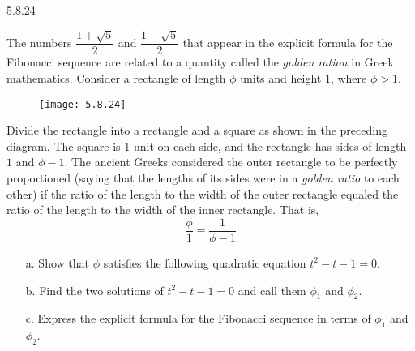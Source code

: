 \newpage
\begin{question}
    {5.8.24}
    {
        The numbers $\dfrac{1 + \sqrt{5}}{2}$ and $\dfrac{1 - \sqrt{5}}{2}$ that appear in the explicit formula for the Fibonacci sequence are related to a quantity called the \textit{golden ration} in Greek mathematics. Consider a rectangle of length $\phi$ units and height $1$, where $\phi > 1$.
        \begin{figure}[H]
            \centering
            \texttt{[image: 5.8.24]}
        \end{figure}
        Divide the rectangle into a rectangle and a square as shown in the preceding diagram. The square is $1$ unit on each side, and the rectangle has sides of length $1$ and $\phi - 1$.
        The ancient Greeks considered the outer rectangle to be perfectly proportioned (saying that the lengths of its sides were in a \textit{golden ratio} to each other) if the ratio of the length to the width of the outer rectangle equaled the ratio of the length to the width of the inner rectangle. That is,
        \begin{equation*}
            \frac{\phi}{1} = \frac{1}{\phi - 1}
        \end{equation*}
        \begin{enumerate}
            \item[a.] Show that $\phi$ satisfies the following quadratic equation $t^2 - t - 1 = 0$.
            \item[b.] Find the two solutions of $t^2 - t - 1 = 0$ and call them $\phi_1$ and $\phi_2$.
            \item[c.] Express the explicit formula for the Fibonacci sequence in terms of $\phi_1$ and $\phi_2$.
        \end{enumerate}
    }
\end{question}
